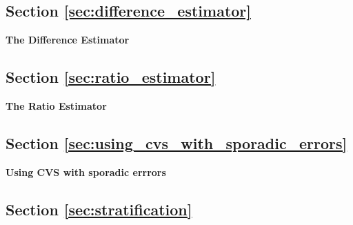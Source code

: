 \subsection{Section \ref{sec:difference_estimator}}

\begin{exercise}
\label{ex:difference_estimator}

\textbf{The Difference Estimator}





\end{exercise}

\subsection{Section \ref{sec:ratio_estimator}}

\begin{exercise}
\label{ex:ratio_estimator}

\textbf{The Ratio Estimator}






\end{exercise}

\subsection{Section \ref{sec:using_cvs_with_sporadic_errors}}

\begin{exercise}
\label{ex:sporadic}

\textbf{Using CVS with sporadic errrors}









\end{exercise}

\subsection{Section \ref{sec:stratification}}

